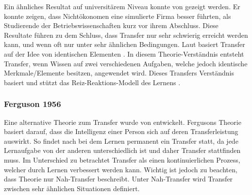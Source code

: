 Ein ähnliches Resultat auf universitärem Niveau konnte von \citet{Renkl1994} gezeigt werden. Er konnte zeigen, dass Nichtökonomen eine simulierte Firma besser führten, als Studierende der Betriebswissenschaften kurz vor ihrem Abschluss. Diese Resultate führen zu dem Schluss, dass Transfer nur sehr schwierig erreicht werden kann, und wenn oft nur unter sehr ähnlichen Bedingungen. Laut \citet{Woodworth1901} basiert Transfer auf der Idee von identischen Elementen \citep{Pea2013b}. In diesem Theorie-Verständnis entsteht Transfer, wenn Wissen auf zwei verschiedenen Aufgaben, welche jedoch identische Merkmale/Elemente besitzen, angewendet wird. Dieses Transfers Verständnis basiert und stützt das Reiz-Reaktions-Modell des Lernens \citep{Detterman1993, Mietzel2007}.


\subsubsection{Ferguson 1956}
Eine alternative Theorie zum Transfer wurde von \citet{Ferguson1956} entwickelt. Fergusons Theorie basiert darauf, dass die Intelligenz einer Person sich auf deren Transferleistung auswirkt. So findet nach \citet{Ferguson1956} bei dem Lernen permanent ein Transfer statt, da jede Lernaufgabe von der anderen unterschiedlich ist und daher Transfer stattfinden muss. Im Unterschied zu \citet{Woodworth1901} betrachtet \citeauthor{Ferguson1956} Transfer als einen kontinuierlichen Prozess, welcher durch Lernen verbessert werden kann. Wichtig ist jedoch zu beachten, dass \citeauthor{Ferguson1956} Theorie nur Nah-Transfer beschreibt. Unter Nah-Transfer wird Transfer zwischen sehr ähnlichen Situationen definiert. 


